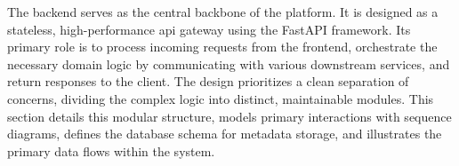 The backend serves as the central backbone of the platform. It is designed as a stateless, high-performance \acs{api} gateway using the FastAPI framework. Its primary role is to process incoming requests from the frontend, orchestrate the necessary domain logic by communicating with various downstream services, and return responses to the client. The design prioritizes a clean separation of concerns, dividing the complex logic into distinct, maintainable modules. This section details this modular structure, models primary interactions with sequence diagrams, defines the database schema for metadata storage, and illustrates the primary data flows within the system.
